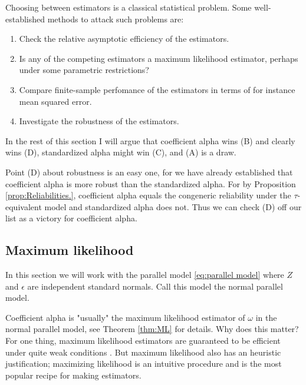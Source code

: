 \documentclass{article}
\theoremstyle{plain}
\theoremstyle{plain}
\theoremstyle{definition}
\theoremstyle{remark}
\theoremstyle{definition}
\theoremstyle{plain}
\theoremstyle{plain}
\theoremstyle{definition}
\DeclareMathOperator{\Cor}{Cor}
\begin{document}
Choosing between estimators is a classical statistical problem. Some well-established methods to attack such problems are:


\begin{enumerate}[label=(\Alph*)]
\item Check the relative asymptotic efficiency of the estimators.
\item Is any of the competing estimators a maximum likelihood estimator, perhaps under some parametric restrictions?
\item Compare finite-sample perfomance of the estimators in terms of for instance mean squared error.
\item Investigate the robustness of the estimators.
\end{enumerate}

In the rest of this section I will argue that coefficient alpha wins (B) and clearly wins (D), standardized alpha might win (C), and (A) is a draw.  

Point (D) about robustness is an easy one, for we have already established that coefficient alpha is more robust than the standardized alpha. For by Proposition \ref{prop:Reliabilities.}, coefficient alpha equals the congeneric reliability under the $\tau$-equivalent model and standardized alpha does not. Thus we can check (D) off our list as a victory for coefficient alpha.

\subsection{Maximum likelihood}
In this section we will work with the parallel model \eqref{eq:parallel model} where $Z$ and $\epsilon$ are independent standard normals. Call this model the normal parallel model.

Coefficient alpha is "usually" the maximum likelihood estimator of $\omega$ in the normal parallel model, see Theorem \ref{thm:ML} for details. Why does this matter? For one thing, maximum likelihood estimators are guaranteed to be efficient under quite weak conditions \citep[][Section 7.3]{Lehmann2004-ke}. But maximum likelihood also has an heuristic justification; maximizing likelihood is an intuitive procedure and is the most popular recipe for making estimators.
\end{document}

